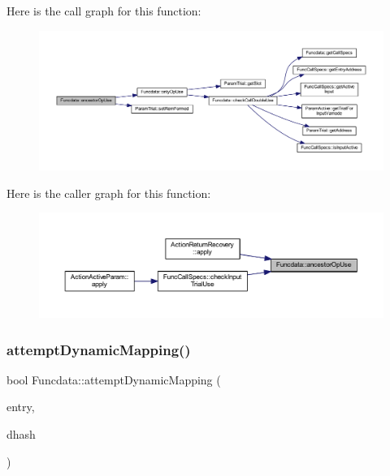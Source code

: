 Here is the call graph for this function\+:
\nopagebreak
\begin{figure}[H]
\begin{center}
\leavevmode
\includegraphics[width=350pt]{class_funcdata_adfa02a817ac34b428cac2a327d1891c0_cgraph}
\end{center}
\end{figure}
Here is the caller graph for this function\+:
\nopagebreak
\begin{figure}[H]
\begin{center}
\leavevmode
\includegraphics[width=350pt]{class_funcdata_adfa02a817ac34b428cac2a327d1891c0_icgraph}
\end{center}
\end{figure}
\mbox{\label{class_funcdata_adeee32fc648486d26cd17ebb37bb118f}} 
\subsubsection{\texorpdfstring{attemptDynamicMapping()}{attemptDynamicMapping()}}
{\footnotesize\ttfamily bool Funcdata\+::attempt\+Dynamic\+Mapping (\begin{DoxyParamCaption}\item[{\mbox{\hyperlink{class_symbol_entry}{Symbol\+Entry}} $\ast$}]{entry,  }\item[{\mbox{\hyperlink{class_dynamic_hash}{Dynamic\+Hash}} \&}]{dhash }\end{DoxyParamCaption})}



